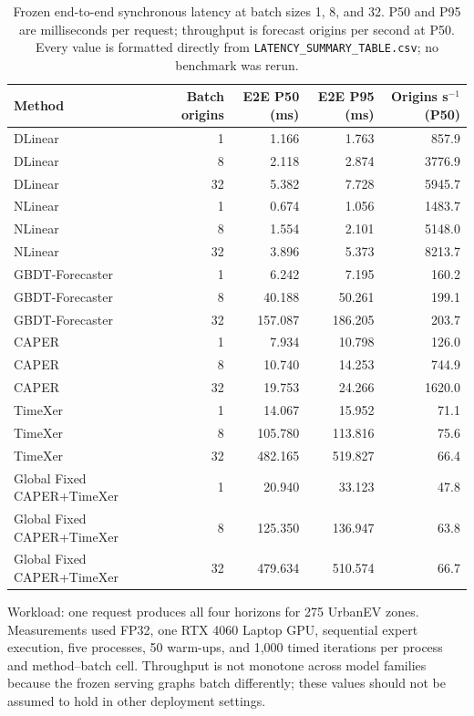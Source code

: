 \begin{table}[htbp]
\centering
\caption{Frozen end-to-end synchronous latency at batch sizes 1, 8, and 32. P50 and P95 are milliseconds per request; throughput is forecast origins per second at P50. Every value is formatted directly from \texttt{LATENCY\_SUMMARY\_TABLE.csv}; no benchmark was rerun.}
\label{tab:latency-all-batches}
\footnotesize
\begin{tabular}{lrrrr}
\toprule
Method & Batch origins & E2E P50 (ms) & E2E P95 (ms) & Origins s$^{-1}$ (P50) \\
\midrule
DLinear & 1 & 1.166 & 1.763 & 857.9 \\
DLinear & 8 & 2.118 & 2.874 & 3776.9 \\
DLinear & 32 & 5.382 & 7.728 & 5945.7 \\
\addlinespace[2pt]
NLinear & 1 & 0.674 & 1.056 & 1483.7 \\
NLinear & 8 & 1.554 & 2.101 & 5148.0 \\
NLinear & 32 & 3.896 & 5.373 & 8213.7 \\
\addlinespace[2pt]
GBDT-Forecaster & 1 & 6.242 & 7.195 & 160.2 \\
GBDT-Forecaster & 8 & 40.188 & 50.261 & 199.1 \\
GBDT-Forecaster & 32 & 157.087 & 186.205 & 203.7 \\
\addlinespace[2pt]
CAPER & 1 & 7.934 & 10.798 & 126.0 \\
CAPER & 8 & 10.740 & 14.253 & 744.9 \\
CAPER & 32 & 19.753 & 24.266 & 1620.0 \\
\addlinespace[2pt]
TimeXer & 1 & 14.067 & 15.952 & 71.1 \\
TimeXer & 8 & 105.780 & 113.816 & 75.6 \\
TimeXer & 32 & 482.165 & 519.827 & 66.4 \\
\addlinespace[2pt]
Global Fixed CAPER+TimeXer & 1 & 20.940 & 33.123 & 47.8 \\
Global Fixed CAPER+TimeXer & 8 & 125.350 & 136.947 & 63.8 \\
Global Fixed CAPER+TimeXer & 32 & 479.634 & 510.574 & 66.7 \\
\bottomrule
\end{tabular}
\begin{minipage}{0.94\linewidth}\vspace{3pt}\footnotesize
Workload: one request produces all four horizons for 275 UrbanEV zones. Measurements used FP32, one RTX 4060 Laptop GPU, sequential expert execution, five processes, 50 warm-ups, and 1,000 timed iterations per process and method--batch cell. Throughput is not monotone across model families because the frozen serving graphs batch differently; these values should not be assumed to hold in other deployment settings.
\end{minipage}
\end{table}
